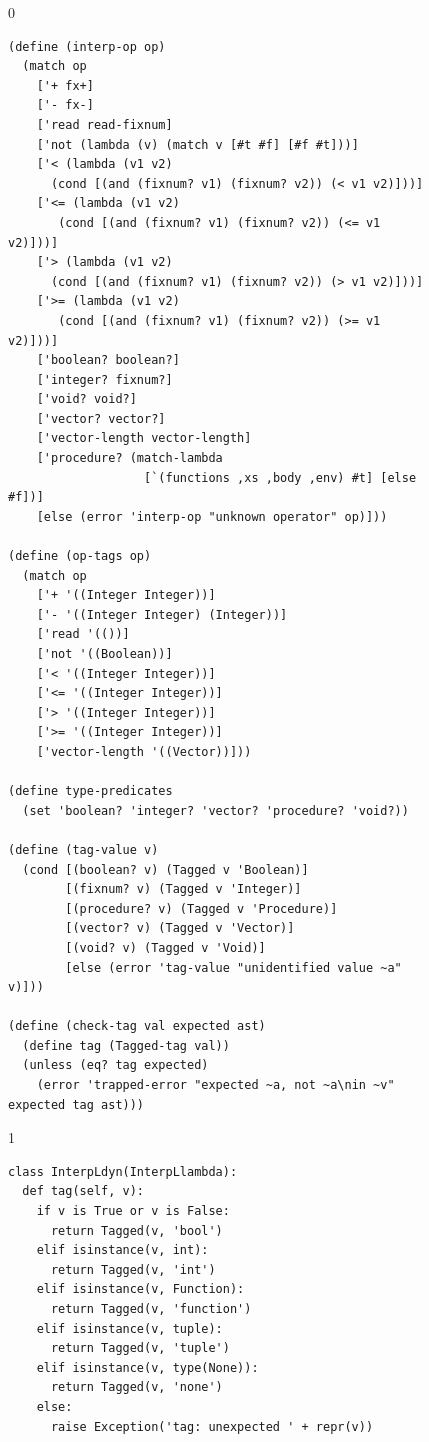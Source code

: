 \documentclass[7x10]{TimesAPriori_MIT}%
\def\racketEd{0}
\def\pythonEd{1}
\providecommand{\BookEdition}{1}
\let\edition\BookEdition
\newcommand{\pythonColor}[0]{}
\numberwithin{theorem}{chapter}
\numberwithin{definition}{chapter}
\numberwithin{equation}{chapter}
\begin{document}
\begin{figure}[tbp]
  \begin{tcolorbox}[colback=white]
    {\if\edition\racketEd
\begin{lstlisting}[basicstyle=\ttfamily\footnotesize]
(define (interp-op op)
  (match op
    ['+ fx+]
    ['- fx-]
    ['read read-fixnum]
    ['not (lambda (v) (match v [#t #f] [#f #t]))]
    ['< (lambda (v1 v2)
	  (cond [(and (fixnum? v1) (fixnum? v2)) (< v1 v2)]))]
    ['<= (lambda (v1 v2)
	   (cond [(and (fixnum? v1) (fixnum? v2)) (<= v1 v2)]))]
    ['> (lambda (v1 v2)
	  (cond [(and (fixnum? v1) (fixnum? v2)) (> v1 v2)]))]
    ['>= (lambda (v1 v2)
	   (cond [(and (fixnum? v1) (fixnum? v2)) (>= v1 v2)]))]
    ['boolean? boolean?]
    ['integer? fixnum?]
    ['void? void?]
    ['vector? vector?]
    ['vector-length vector-length]
    ['procedure? (match-lambda
                   [`(functions ,xs ,body ,env) #t] [else #f])]
    [else (error 'interp-op "unknown operator" op)]))

(define (op-tags op)
  (match op
    ['+ '((Integer Integer))]
    ['- '((Integer Integer) (Integer))]
    ['read '(())]
    ['not '((Boolean))]
    ['< '((Integer Integer))]
    ['<= '((Integer Integer))]
    ['> '((Integer Integer))]
    ['>= '((Integer Integer))]
    ['vector-length '((Vector))]))

(define type-predicates
  (set 'boolean? 'integer? 'vector? 'procedure? 'void?))

(define (tag-value v)
  (cond [(boolean? v) (Tagged v 'Boolean)]
        [(fixnum? v) (Tagged v 'Integer)]
        [(procedure? v) (Tagged v 'Procedure)]
        [(vector? v) (Tagged v 'Vector)]
        [(void? v) (Tagged v 'Void)]
        [else (error 'tag-value "unidentified value ~a" v)]))

(define (check-tag val expected ast)
  (define tag (Tagged-tag val))
  (unless (eq? tag expected)
    (error 'trapped-error "expected ~a, not ~a\nin ~v" expected tag ast)))
\end{lstlisting}
\fi}
{\if\edition\pythonEd\pythonColor
\begin{lstlisting}[basicstyle=\ttfamily\footnotesize]
class InterpLdyn(InterpLlambda):
  def tag(self, v):
    if v is True or v is False:
      return Tagged(v, 'bool')
    elif isinstance(v, int):
      return Tagged(v, 'int')
    elif isinstance(v, Function):
      return Tagged(v, 'function')
    elif isinstance(v, tuple):
      return Tagged(v, 'tuple')
    elif isinstance(v, type(None)):
      return Tagged(v, 'none')
    else:
      raise Exception('tag: unexpected ' + repr(v))


\end{lstlisting}}
\end{tcolorbox}
\end{figure}
\end{document}
